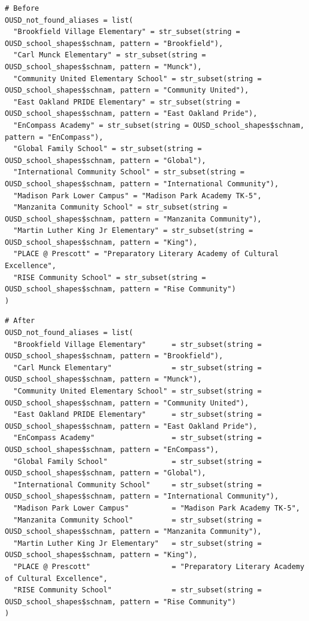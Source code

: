 \documentclass[]{book}
\begin{document}
\begin{verbatim}
# Before
OUSD_not_found_aliases = list(
  "Brookfield Village Elementary" = str_subset(string = OUSD_school_shapes$schnam, pattern = "Brookfield"),
  "Carl Munck Elementary" = str_subset(string = OUSD_school_shapes$schnam, pattern = "Munck"),
  "Community United Elementary School" = str_subset(string = OUSD_school_shapes$schnam, pattern = "Community United"),
  "East Oakland PRIDE Elementary" = str_subset(string = OUSD_school_shapes$schnam, pattern = "East Oakland Pride"),
  "EnCompass Academy" = str_subset(string = OUSD_school_shapes$schnam, pattern = "EnCompass"),
  "Global Family School" = str_subset(string = OUSD_school_shapes$schnam, pattern = "Global"),
  "International Community School" = str_subset(string = OUSD_school_shapes$schnam, pattern = "International Community"),
  "Madison Park Lower Campus" = "Madison Park Academy TK-5",
  "Manzanita Community School" = str_subset(string = OUSD_school_shapes$schnam, pattern = "Manzanita Community"),
  "Martin Luther King Jr Elementary" = str_subset(string = OUSD_school_shapes$schnam, pattern = "King"),
  "PLACE @ Prescott" = "Preparatory Literary Academy of Cultural Excellence",
  "RISE Community School" = str_subset(string = OUSD_school_shapes$schnam, pattern = "Rise Community")
)
\end{verbatim}

\begin{verbatim}
# After
OUSD_not_found_aliases = list(
  "Brookfield Village Elementary"      = str_subset(string = OUSD_school_shapes$schnam, pattern = "Brookfield"),
  "Carl Munck Elementary"              = str_subset(string = OUSD_school_shapes$schnam, pattern = "Munck"),
  "Community United Elementary School" = str_subset(string = OUSD_school_shapes$schnam, pattern = "Community United"),
  "East Oakland PRIDE Elementary"      = str_subset(string = OUSD_school_shapes$schnam, pattern = "East Oakland Pride"),
  "EnCompass Academy"                  = str_subset(string = OUSD_school_shapes$schnam, pattern = "EnCompass"),
  "Global Family School"               = str_subset(string = OUSD_school_shapes$schnam, pattern = "Global"),
  "International Community School"     = str_subset(string = OUSD_school_shapes$schnam, pattern = "International Community"),
  "Madison Park Lower Campus"          = "Madison Park Academy TK-5",
  "Manzanita Community School"         = str_subset(string = OUSD_school_shapes$schnam, pattern = "Manzanita Community"),
  "Martin Luther King Jr Elementary"   = str_subset(string = OUSD_school_shapes$schnam, pattern = "King"),
  "PLACE @ Prescott"                   = "Preparatory Literary Academy of Cultural Excellence",
  "RISE Community School"              = str_subset(string = OUSD_school_shapes$schnam, pattern = "Rise Community")
)
\end{verbatim}
\end{document}
